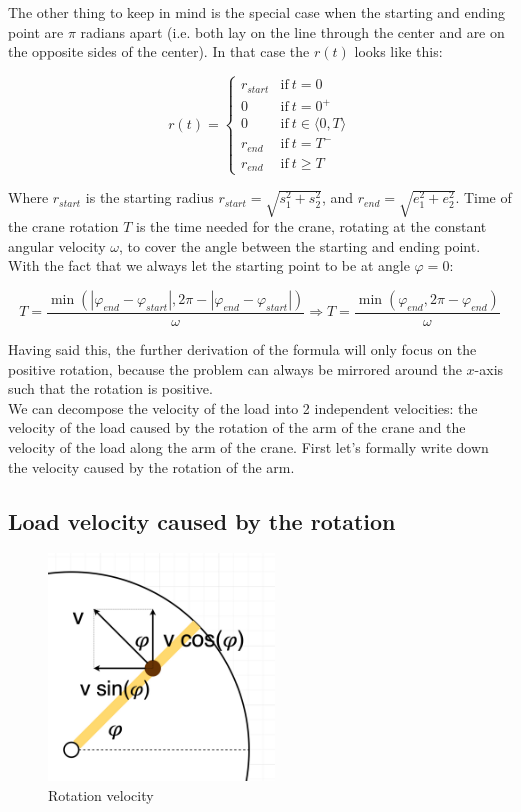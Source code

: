 \documentclass[11pt]{article}
\begin{document}
The other thing to keep in mind is the special case when the starting and ending point are $\pi$ radians apart (i.e. both lay on the line through the center and are on the opposite sides of the center). In that case the $r(t)$ looks like this:

\[ r(t) = \begin{cases}
      r_{start} & \text{if} \ t = 0 \\
      0 & \text{if} \ t = 0^{+} \\
      0 & \text{if} \ t \in \langle 0,T \rangle \\
      r_{end} & \text{if} \ t = T^{-} \\
      r_{end} & \text{if} \ t \geq T
   \end{cases}
\]

Where $r_{start}$ is the starting radius $r_{start} = \sqrt{s_1^2 + s_2^2}$, and $r_{end} = \sqrt{e_1^2 + e_2^2}$. Time of the crane rotation $T$ is the time needed for the crane, rotating at the constant angular velocity $\omega$, to cover the angle between the starting and ending point. With the fact that we always let the starting point to be at angle $\varphi = 0$:

\[
    T = \frac{\min{(|\varphi_{end} - \varphi_{start}|, 2\pi - |\varphi_{end} - \varphi_{start}|)}}{\omega} \Rightarrow T = \frac{\min{(\varphi_{end}, 2\pi - \varphi_{end})}}{\omega}
\]

Having said this, the further derivation of the formula will only focus on the positive rotation, because the problem can always be mirrored around the $x$-axis such that the rotation is positive.\\

We can decompose the velocity of the load into 2 independent velocities: the velocity of the load caused by the rotation of the arm of the crane and the velocity of the load along the arm of the crane. First let's formally write down the velocity caused by the rotation of the arm.\\

\subsection{Load velocity caused by the rotation}

\begin{figure}[H]
\centering
\includegraphics[width=6cm]{img/rotation_velocity.jpg}
\caption{Rotation velocity}
\label{fig:rot_velocity}
\end{figure}
\end{document}
